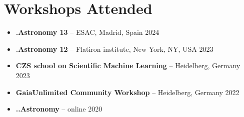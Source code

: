 \section*{Workshops Attended}

\begin{itemize}
    \item \textbf{.Astronomy 13} -- ESAC, Madrid, Spain \hfill 2024
    \item \textbf{.Astronomy 12} -- Flatiron institute, New York, NY, USA \hfill 2023
    \item \textbf{CZS school on Scientific Machine Learning} -- Heidelberg, Germany \hfill 2023
    \item \textbf{GaiaUnlimited Community Workshop} -- Heidelberg, Germany \hfill 2022
    \item \textbf{..Astronomy} -- online \hfill 2020
\end{itemize}